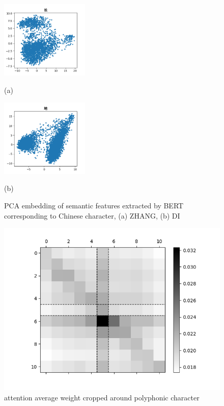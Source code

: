 \documentclass[a4paper]{article}
\begin{document}
\begin{figure}[t]
	\begin{minipage}[b]{.48\linewidth}
		\centering
		\centerline{\includegraphics[width=4.2cm]{pics/zhang1.png}}
		\centerline{(a)  }\medskip
	\end{minipage}
	\hfill
	\begin{minipage}[b]{0.48\linewidth}
		\centering
		\centerline{\includegraphics[width=4.2cm]{pics/di1.png}}
		\centerline{(b)}\medskip
	\end{minipage}
	
	\caption{PCA embedding of semantic features extracted by BERT corresponding to Chinese character, (a)  ZHANG, (b) DI}
	\label{fig:pca}
\end{figure}

\begin{figure}[t]
	\centering
	\includegraphics[scale=0.35]{pics/attensep.png}
	\caption{attention average weight cropped around polyphonic character}
	\label{fig:attenmap}
\end{figure}
\end{document}
